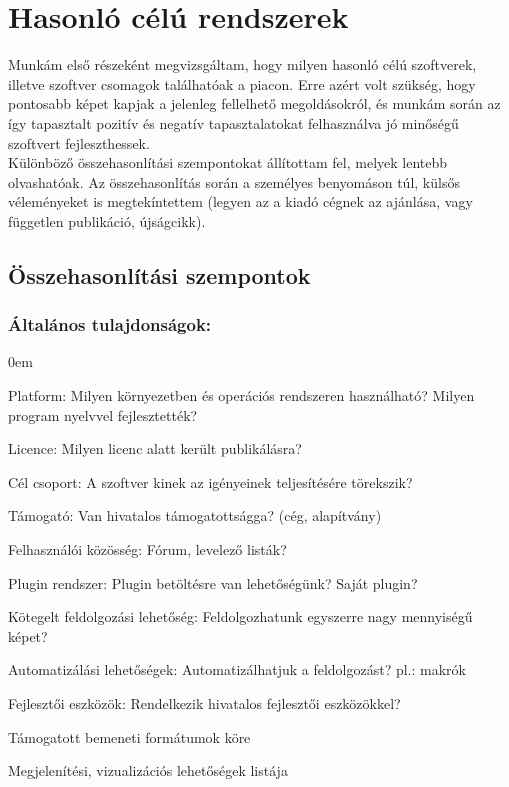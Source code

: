 \documentclass[a4paper,12pt,oneside]{report}
\begin{document}
\section{Hasonló célú rendszerek}
Munkám első részeként megvizsgáltam, hogy milyen hasonló célú szoftverek, illetve szoftver csomagok találhatóak a piacon. Erre azért volt szükség, hogy pontosabb képet kapjak a jelenleg fellelhető megoldásokról, és munkám során az így tapasztalt pozitív és negatív tapasztalatokat felhasználva jó minőségű szoftvert fejleszthessek.\\
Különböző összehasonlítási szempontokat állítottam fel, melyek lentebb olvashatóak. Az összehasonlítás során a személyes benyomáson túl, külsős véleményeket is megtekíntettem (legyen az a kiadó cégnek az ajánlása, vagy független publikáció, újságcikk).
\subsection{Összehasonlítási szempontok}

\subsubsection{Általános tulajdonságok:}
\begin{description}
	\itemsep0em
	\item Platform: Milyen környezetben és operációs rendszeren használható? Milyen program nyelvvel fejlesztették?
	\item Licence: Milyen licenc alatt került publikálásra?
	\item Cél csoport: A szoftver kinek az igényeinek teljesítésére törekszik?
	\item Támogató: Van hivatalos támogatottságga? (cég, alapítvány)
	\item Felhasználói közösség: Fórum, levelező listák?
	\item Plugin rendszer: Plugin betöltésre van lehetőségünk? Saját plugin?
	\item Kötegelt feldolgozási lehetőség: Feldolgozhatunk egyszerre nagy mennyiségű képet?
	\item Automatizálási lehetőségek: Automatizálhatjuk a feldolgozást? pl.: makrók
	\item Fejlesztői eszközök: Rendelkezik hivatalos fejlesztői eszközökkel?
	\item Támogatott bemeneti formátumok köre
	\item Megjelenítési, vizualizációs lehetőségek listája

\end{description}
\end{document}
